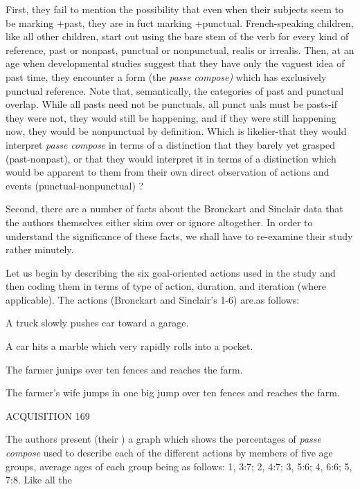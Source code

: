 First, they fail to mention the possibility that even when their subjects seem to be marking +past, they are in fuct marking +punctual. French-speaking children, like all other children, start out using the bare stem of the verb for every kind of reference, past or nonpast, punctual or nonpunctual, realis or irrealis. Then, at an age when devel\-opmental studies suggest that they have only the vaguest idea of past time, they encounter a form (the \textit{passe} \textit{compos}\textit{e}\textit{)} which has exclusively punctual reference. Note that, semantically, the categories of past and punctual overlap. While all pasts need not be punctuals, all punct uals must be pasts-if they were not, they would still be happening, and if they were still happening now, they would be nonpunctual by defini\-tion. Which is likelier-that they would interpret \textit{passe} \textit{compose} in terms of a distinction that they barely yet grasped (past-nonpast), or that they would interpret it in terms of a distinction which would be apparent to them from their own direct observation of actions and events (punctual-nonpunctual) ?

Second, there are a number of facts about the Bronckart and Sinclair data that the authors themselves either skim over or ignore altogether. In order to understand the significance of these facts, we shall have to re-examine their study rather minutely.

Let us begin by describing the six goal-oriented actions used in the study and then coding them in terms of type of action, duration, and iteration (where applicable). The actions (Bronckart and Sinclair's 1{}-6) are.as follows:

\ea\label{ex:16}
 A truck slowly pushes car toward a garage.
\glt
\z

\ea\label{ex:17}
 A car hits a marble which very rapidly rolls into a pocket.
\glt
\z

\ea\label{ex:18}
 The farmer junips over ten fences and reaches the farm.
\glt
\z

\ea\label{ex:19}
 The farmer's wife jumps in one big jump over ten fences and reaches the farm.
\glt
\z


ACQUISITION 169

The authors present (their ) a graph which shows the percentages of \textit{passe} \textit{compose} used to describe each of the different actions by members of five age groups, average ages of each group being as follows: 1, 3:7; 2, 4:7; 3, 5:6; 4, 6:6; 5, 7:8. Like all the

